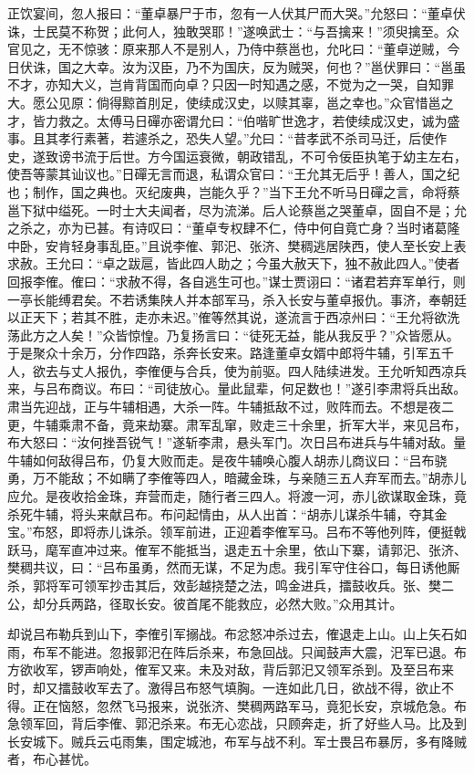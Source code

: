 正饮宴间，忽人报曰：“董卓暴尸于市，忽有一人伏其尸而大哭。”允怒曰：“董卓伏诛，士民莫不称贺；此何人，独敢哭耶！”遂唤武士：“与吾擒来！”须臾擒至。众官见之，无不惊骇：原来那人不是别人，乃侍中蔡邕也，允叱曰：“董卓逆贼，今日伏诛，国之大幸。汝为汉臣，乃不为国庆，反为贼哭，何也？”邕伏罪曰：“邕虽不才，亦知大义，岂肯背国而向卓？只因一时知遇之感，不觉为之一哭，自知罪大。愿公见原：倘得黥首刖足，使续成汉史，以赎其辜，邕之幸也。”众官惜邕之才，皆力救之。太傅马日磾亦密谓允曰：“伯喈旷世逸才，若使续成汉史，诚为盛事。且其孝行素著，若遽杀之，恐失人望。”允曰：“昔孝武不杀司马迁，后使作史，遂致谤书流于后世。方今国运衰微，朝政错乱，不可令佞臣执笔于幼主左右，使吾等蒙其讪议也。”日磾无言而退，私谓众官曰：“王允其无后乎！善人，国之纪也；制作，国之典也。灭纪废典，岂能久乎？”当下王允不听马日磾之言，命将蔡邕下狱中缢死。一时士大夫闻者，尽为流涕。后人论蔡邕之哭董卓，固自不是；允之杀之，亦为已甚。有诗叹曰：“董卓专权肆不仁，侍中何自竟亡身？当时诸葛隆中卧，安肯轻身事乱臣。”且说李傕、郭汜、张济、樊稠逃居陕西，使人至长安上表求赦。王允曰：“卓之跋扈，皆此四人助之；今虽大赦天下，独不赦此四人。”使者回报李傕。傕曰：“求赦不得，各自逃生可也。”谋士贾诩曰：“诸君若弃军单行，则一亭长能缚君矣。不若诱集陕人并本部军马，杀入长安与董卓报仇。事济，奉朝廷以正天下；若其不胜，走亦未迟。”傕等然其说，遂流言于西凉州曰：“王允将欲洗荡此方之人矣！”众皆惊惶。乃复扬言曰：“徒死无益，能从我反乎？”众皆愿从。于是聚众十余万，分作四路，杀奔长安来。路逢董卓女婿中郎将牛辅，引军五千人，欲去与丈人报仇，李傕便与合兵，使为前驱。四人陆续进发。王允听知西凉兵来，与吕布商议。布曰：“司徒放心。量此鼠辈，何足数也！”遂引李肃将兵出敌。肃当先迎战，正与牛辅相遇，大杀一阵。牛辅抵敌不过，败阵而去。不想是夜二更，牛辅乘肃不备，竟来劫寨。肃军乱窜，败走三十余里，折军大半，来见吕布，布大怒曰：“汝何挫吾锐气！”遂斩李肃，悬头军门。次日吕布进兵与牛辅对敌。量牛辅如何敌得吕布，仍复大败而走。是夜牛辅唤心腹人胡赤儿商议曰：“吕布骁勇，万不能敌；不如瞒了李傕等四人，暗藏金珠，与亲随三五人弃军而去。”胡赤儿应允。是夜收拾金珠，弃营而走，随行者三四人。将渡一河，赤儿欲谋取金珠，竟杀死牛辅，将头来献吕布。布问起情由，从人出首：“胡赤儿谋杀牛辅，夺其金宝。”布怒，即将赤儿诛杀。领军前进，正迎着李傕军马。吕布不等他列阵，便挺戟跃马，麾军直冲过来。傕军不能抵当，退走五十余里，依山下寨，请郭汜、张济、樊稠共议，曰：“吕布虽勇，然而无谋，不足为虑。我引军守住谷口，每日诱他厮杀，郭将军可领军抄击其后，效彭越挠楚之法，鸣金进兵，擂鼓收兵。张、樊二公，却分兵两路，径取长安。彼首尾不能救应，必然大败。”众用其计。

却说吕布勒兵到山下，李傕引军搦战。布忿怒冲杀过去，傕退走上山。山上矢石如雨，布军不能进。忽报郭汜在阵后杀来，布急回战。只闻鼓声大震，汜军已退。布方欲收军，锣声响处，傕军又来。未及对敌，背后郭汜又领军杀到。及至吕布来时，却又擂鼓收军去了。激得吕布怒气填胸。一连如此几日，欲战不得，欲止不得。正在恼怒，忽然飞马报来，说张济、樊稠两路军马，竟犯长安，京城危急。布急领军回，背后李傕、郭汜杀来。布无心恋战，只顾奔走，折了好些人马。比及到长安城下。贼兵云屯雨集，围定城池，布军与战不利。军士畏吕布暴厉，多有降贼者，布心甚忧。

